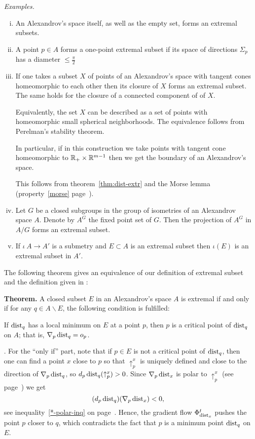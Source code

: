 \documentclass{article}
\begin{document}
\noi\textit{Examples.}
\begin{enumerate}[(i)]
\item An Alexandrov's space itself, as well as the empty set, forms an extremal subsets.
\item A point $p\in A$ forms a one-point extremal subset if its
space of directions $\Sigma_p$ has a diameter $\le\tfrac\pi2$
\item \label{ex:t-cone}
If one takes a subset $X$ of points of an Alexandrov's space with tangent cones
homeomorphic to each other then its closure of $X$ forms an extremal subset.
The same holds for the closure of a connected component of of $X$.

Equivalently, the set $X$ can be described as a set of points with homeomorphic small spherical neighborhoods. The equivalence follows from Perelman's stability theorem.

In particular, if in this construction we take points with tangent cone homeomorphic
to $\mathbb{R}_{+}\times \mathbb{R}^{m-1}$ then we get the boundary of an Alexandrov's space.

This follows from theorem~\ref{thm:dist-extr} and the Morse lemma (property~\ref{morse} page~\pageref{morse}). 

\item  Let $G$ be a closed subgroups in the group of isometries of an Alexandrov space $A$.
Denote by $A^G$ the fixed point set of $G$.
Then the projection of $A^G$ in $A/G$ forms an extremal subset.

\item If $\iota\:A\to A'$ is a submetry and $E\subset A$ is an extremal subset then $\iota(E)$ is an extremal subset in $A'$.
\end{enumerate}


\noi The following theorem gives an equivalence of our definition of extremal subset and the definition given in
\cite{perelman-petrunin:extremal}:

\begin{thm}{\bf Theorem.}\label{thm:dist-extr}  A closed subset $E$ in
an Alexandrov's space $A$ is extremal if and only if for any $q\in A\backslash E$,
the following condition is fulfilled:

If $\operatorname{dist}_q$ has a local minimum on $E$ at a point $p$, then $p$ is a critical
point of $\operatorname{dist}_q$ on $A$;
that is, $\nabla_p\operatorname{dist}_q=o_p$.
\end{thm}

\Proof. For the ``only if'' part, note that if $p\in E$ is not a critical point of
$\operatorname{dist}_q$, then one can find a point $x$ close to $p$ so that $\uparrow_p^x$ is
uniquely defined and close to the direction of $\nabla_p\operatorname{dist}_q$,
so $d_p\operatorname{dist}_q(\uparrow_p^x)>0$. 
Since $\nabla_p\operatorname{dist}_x$ is polar to $\uparrow_p^x$ (see
page~\pageref{supp-polar}) we get 
$$(d_p\operatorname{dist}_q)(\nabla_p\operatorname{dist}_x)<0,$$ 
see inequality~\ref{*-polar-inq} on page~\pageref{*-polar-inq}.
Hence, the gradient flow $\Phi_{\operatorname{dist}_x}^t$ pushes the point $p$ closer to $q$, which
contradicts the fact that $p$ is a minimum point $\operatorname{dist}_q$ on $E$.
\end{document}
